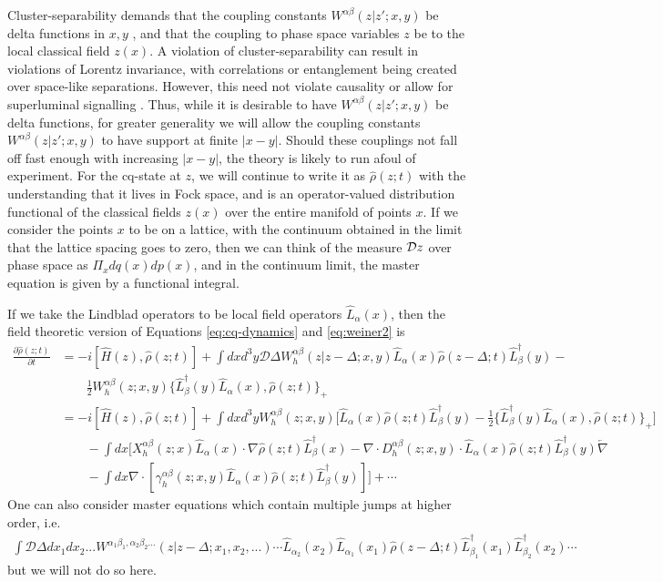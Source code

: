 \documentclass[aps,pra,showpacs,citeautoscript,amsmath,amssymb,floatfix,superscriptaddress,bbm, verbatim,amsfonts,changes,11pt,nofootinbib,longbibliography]{revtex4-2}
\def\z{{z}}
\def\L{{\hat{L}}}
\def\Hq{\hat{H}}
\def\dist{{\Delta}}
\def\ddf{{\mathcal D}\dist}
\def\rate{{W}}
\def\ab{^{\alpha\beta}}
\def\lax{{\L_\alpha(x)}}
\def\lbx{{\L^\dagger_\beta(x)}}
\def\lby{{\L^\dagger_\beta(y)}}
\def\rateabx{{\rate\ab(\z|\z';x,y)}}
\def\rateabxd{{\rate_h\ab(\z|\z-\dist;x,y)}}
\renewcommand{\varrho}{\hat{\rho}}
\def\psiz{{\varrho(\z;t)}}
\def\psizt{{\varrho(\z;t)}}
\def\psizd{{\varrho(\z-\dist;t)}}
\def\friction{\gamma}
\begin{document}
Cluster-separability \cite{cluster_foot} demands that 
the coupling constants $\rateabx$ be delta functions in $x,y$ \cite{bps}, and that the coupling to phase space variables $\z$ be to the local classical field $\z(x)$. A violation of cluster-separability can result in violations of Lorentz invariance, with correlations or entanglement being created over space-like separations. However, this need not violate causality or allow for superluminal signalling \cite{OR-intrinsic}. Thus, while it is desirable to have $\rateabx$ be delta functions,  for greater generality we will allow the coupling constants $\rateabx$ to have support at finite $|x-y|$. Should these couplings not fall off fast enough with increasing $|x-y|$, the theory is likely to run afoul of experiment.
For the cq-state at $\z$, we will continue to write it as $\psizt$ with the understanding that it lives in Fock space, and is an operator-valued distribution functional of the classical fields $\z(x)$ over the entire manifold of points $x$. If we consider the points $x$ to be on a lattice, with the continuum obtained in the limit that the lattice spacing goes to zero, then we can think of the measure ${\cal D}\z$ over phase space as $\Pi_xdq(x)dp(x)$, and in the continuum limit, the master equation is given by a functional integral. 




If we take the Lindblad operators to be local field operators $\lax$, then the field theoretic version of Equations \eqref{eq:cq-dynamics} and \eqref{eq:weiner2} is 
\begin{align}
  \frac{\partial\psiz}{\partial t}
  &=-i[\Hq(\z),\psiz]
 + \int dxd^3y\ddf
\rateabxd
\L_{\alpha}(x)\psizd\L_{\beta}^\dagger(y)
  -
\nonumber\\
& \qquad \frac{1}{2}\rate_h\ab(\z;x,y)\{\lby\lax,\psiz\}_+   
\\
  &=-i[\Hq(\z),\psiz]
 + 
 \int dx d^3y
\rate_h\ab(\z;x,y)\Big[ \lax\psiz\lby
  -\frac{1}{2}
\{\L_{\beta}^\dagger(y)\L_{\alpha}(x),\psiz\}_+   
\Big]
\nonumber\\
&
\qquad -
\int dx  
\Big[  X^{\alpha\beta}_h(\z;x)
\lax\cdot\nabla \psiz\lbx
- \nabla\cdot D_h^{\alpha\beta}(\z;x,y)\cdot
\L_{\alpha}(x)
\psiz
\L_{\beta}^\dagger(y)
\overleftarrow{\nabla}\nonumber\\
&
\qquad-\int dx\nabla\cdot[
\friction^{\alpha\beta}_h(\z;x,y)
\lax\psiz\lby]
  \Big] +\cdots  
\label{eq:weinerfields}
\end{align}
One can also consider master equations which contain multiple jumps at higher order, i.e.
	\begin{align}
		\int \ddf dx_1 dx_2... \rate^{\alpha_1\beta_1,\alpha_2\beta_2...}(\z|\z-\dist;x_1,x_2,...)\cdots\L_{\alpha_2}(x_2)\L_{\alpha_1}(x_1)\psizd\L^\dagger_{\beta_1}(x_1)\L^\dagger_{\beta_2}(x_2)\cdots
		\nonumber
	\end{align}  but we will not do so here.
\end{document}

